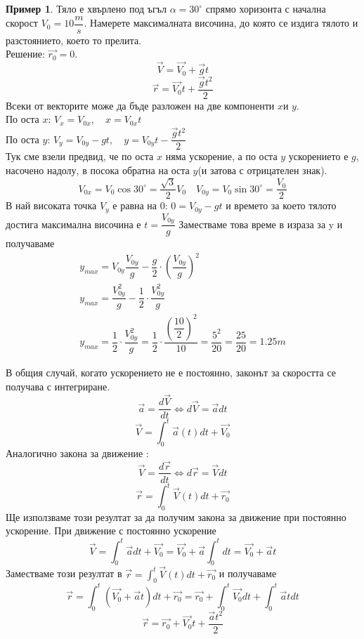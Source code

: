 \documentclass[fleqn, 12pt]{article}
\theoremstyle{definition}
\newtheorem{example}{Пример}[subsection]
\begin{document}
\begin{example}
Тяло е хвърлено под ъгъл $\alpha = 30^\circ $ спрямо хоризонта с начална скорост 
$V_0 = 10 \dfrac{m}{s}$. Намерете максималната височина, до която се издига тялото и разстоянието, което то прелита. \\
Решение: $\vec{r_0} = 0$. \\
$$\vec{V} = \vec{V_0} + \vec{g}t$$
$$\vec{r} = \vec{V_0}t + \dfrac{\vec{g}t^2}{2}$$
Всеки от векторите може да бъде разложен на две компоненти $x$и $y$. \\
По оста $x$: $V_x = V_{0x}, \quad x = V_{0x}t$ \\
По оста $y$: $V_y = V_{0y} - gt, \quad y = V_{0y}t - \dfrac{\vec{g}t^2}{2}$ \\
Тук сме взели предвид, че по оста $x$ няма ускорение, а по оста $y$ ускорението е $g$, насочено надолу, в посока обратна на оста $y$(и затова с отрицателен знак). \\
$$V_{0x} = V_0 \cos{30^\circ} = \dfrac{\sqrt{3}}{2}V_0 \quad V_{0y} = V_0 \sin{30^\circ} = \dfrac{V_0}{2}$$
В най високата точка $V_y$ е равна на 0: $0 = V_{0y} - gt$ и времето за което тялото достига максимална височина е $t = \dfrac{V_{0y}}{g}$
Заместваме това време в израза за y и получаваме 
\begin{gather*}
y_{max} = V_{0y} \dfrac{V_{0y}}{g} - \dfrac{g}{2} \cdot \left(  \dfrac{V_{0y}}{g} \right)^2 \\
y_{max} = \dfrac{V_{0y}^2}{g} - \dfrac{1}{2} \cdot \dfrac{V_{0y}^2}{g}\\
y_{max} = \dfrac{1}{2} \cdot \dfrac{V_{0y}^2}{g} =  \dfrac{1}{2} \cdot \dfrac{\left( \dfrac{10}{2} \right)^2}{10} = \dfrac{5^2}{20} = \dfrac{25}{20} = 1.25m
\end{gather*}
\end{example}
В общия случай, когато ускорението не е постоянно, законът за скоростта се получава с интегриране. 
$$\vec{a} =  \dfrac{d\vec{V}}{dt} \Leftrightarrow d\vec{V} = \vec{a}dt$$
$$\vec{V} = \int _0 ^ t  \vec{a}(t)dt + \vec{V_0}$$
Аналогично закона за движение : 
$$\vec{V} =  \dfrac{d\vec{r}}{dt} \Leftrightarrow d\vec{r} = \vec{V}dt$$
$$\vec{r} = \int _0 ^ t  \vec{V}(t)dt + \vec{r_0}$$
Ще използваме този резултат за да получим закона за движение при постоянно ускорение. При движение с постоянно ускорение  
$$\vec{V} = \int _0 ^ t  \vec{a}dt + \vec{V_0} = \vec{V_0} + \vec{a} \int _0 ^ t dt = \vec{V_0} + \vec{a}t$$
Заместваме този резултат в $\vec{r} = \int _0 ^ t  \vec{V}(t)dt + \vec{r_0}$ и получаваме 
$$\vec{r} = \int _0 ^ t (\vec{V_0} + \vec{a}t) dt + \vec{r_0} = \vec{r_0} + \int _0 ^ t \vec{V_0} dt + \int _0 ^ t \vec{a}t dt$$
$$ \vec{r} = \vec{r_0} + \vec{V_0}t +\dfrac{\vec{a}t^2}{2} $$
\end{document}
